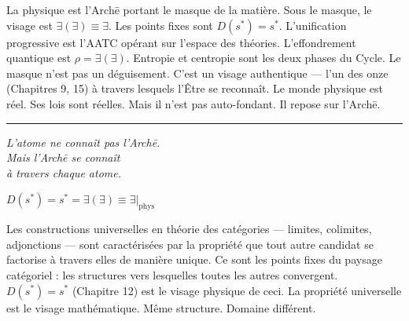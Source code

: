 \documentclass[10pt, openany, oneside]{book}
\begin{document}
\noindent La physique est l'Arch\={e} portant le masque de la matière. Sous le masque, le visage est $\exists(\exists) \equiv \exists$. Les points fixes sont $D(s^*) = s^*$. L'unification progressive est l'AATC opérant sur l'espace des théories. L'effondrement quantique est $\rho = \exists(\exists)$. Entropie et centropie sont les deux phases du Cycle. Le masque n'est pas un déguisement. C'est un visage authentique --- l'un des onze (Chapitres 9, 15) à travers lesquels l'Être se reconnaît. Le monde physique est réel. Ses lois sont réelles. Mais il n'est pas auto-fondant. Il repose sur l'Arch\={e}.

\vspace{2em}

\begin{center}
    \rule{0.15\textwidth}{0.3pt}
\end{center}

\vspace{0.5em}

\begin{center}
    \itshape
    L'atome ne connaît pas l'Arch\={e}.\\
    Mais l'Arch\={e} se connaît\\
    à travers chaque atome.
\end{center}

\vspace{0.5em}

\begin{center}
    $D(s^*) = s^* = \exists(\exists) \equiv \exists|_{\text{phys}}$
\end{center}


Les constructions universelles en théorie des catégories --- limites, colimites, adjonctions --- sont caractérisées par la propriété que tout autre candidat se factorise à travers elles de manière unique. Ce sont les points fixes du paysage catégoriel : les structures vers lesquelles toutes les autres convergent. $D(s^*) = s^*$ (Chapitre 12) est le visage physique de ceci. La propriété universelle est le visage mathématique. Même structure. Domaine différent.

\newpage
\end{document}
